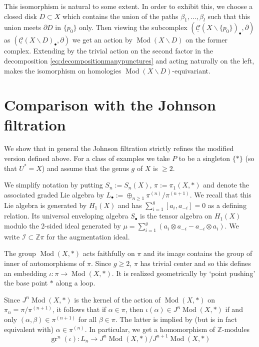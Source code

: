 \documentclass[12pt,letterpaper]{amsart}
\numberwithin{equation}{section}
\def\ZZ{{\mathbb Z}}
\def\ssm{\smallsetminus}
\newcommand{\p}{\partial}
\def\Ical{{\mathcal I}}
\def\Cscr{{\mathscr C}}
\def\pt{{\scriptscriptstyle\bullet}}
\newcommand\gr{\operatorname{gr}}
\newcommand\Mod{\operatorname{Mod}}
\theoremstyle{remark}
\begin{document}
This isomorphism is  natural to some extent. In order to  exhibit this, we choose a closed disk $D\subset X$ which contains the  union of the paths $\beta_1,\ldots, \beta_l$ such that this union meets 
$\p D$ in $\{p_0\}$ only. Then viewing the subcomplex $(\underline{\Cscr}(X\ssm \{p_0\})_\pt, \partial)$ as $(\underline{\Cscr}(X\ssm D)_\pt, \partial)$ we get an action by $\Mod(X\ssm D)$ on the former complex. Extending by the trivial action on the second factor in the decomposition \eqref{eq:decompositionmanypunctures} and acting naturally on the left, makes the isomorphism on homologies $\Mod(X\ssm D)$-equivariant.



\section{Comparison with the Johnson filtration}\label{subsect:comparison}
We show that in general   the Johnson filtration strictly refines the modified version defined above. For a class of  examples  we take 
 $P$  to be a singleton $\{*\}$ (so that $U^*=X$)  and  assume that the genus $g$ of $X$  is $\ge 2$. 

We simplify notation by putting $S_n:=S_n(X)$, $\pi:=\pi_1(X,*)$ and denote the associated graded Lie algebra by $L_\pt:=\oplus_{n\ge 1}\pi^{(n)}/ \pi^{(n+1)}$. We recall that this Lie algebra is generated by  $H_1(X)$ and has  $\sum_{i=1}^g [a_i, a_{-i}]=0$ as a defining relation. Its universal enveloping algebra  $S_\pt$ is the tensor algebra on $H_1(X)$ modulo the 2-sided ideal generated by $\mu=\sum_{i=1}^g (a_i\otimes a_{-i}-a_{-i}\otimes a_i)$.
We write $\Ical\subset \ZZ\pi$ for the augmentation ideal.  


The group $\Mod(X,*)$ acts faithfully on $\pi$ and its image contains the group of inner of automorphisms of  $\pi$.
Since $g\ge 2$,  $\pi$ has trivial center  and so this defines an embedding  $\iota: \pi\to \Mod(X,*)$. It is realized  geometrically by `point pushing' the base point $*$ along a loop. 

Since $J^n\Mod(X,*)$ is the kernel of the action of $\Mod(X,*)$ on $\pi_n=\pi/ \pi^{(n+1)}$, it follows that if $\alpha\in \pi$, then 
$\iota(\alpha)\in J^n\Mod(X,*)$ if and only $(\alpha, \beta)\in \pi^{(n+1)}$ for all $\beta\in \pi$. The latter is implied by (but is in fact equivalent with) 
$\alpha\in \pi^{(n)}$. In particular, we get a homomorphism of $\ZZ$-modules  
\[
\gr^n(\iota):  L_n\to J^n\Mod(X,*)/J^{n+1}\Mod(X,*)
\]
\end{document}
